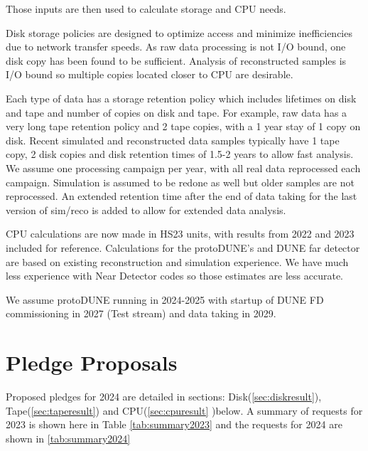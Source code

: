 \documentclass[12pt]{article}
\begin{document}
Those inputs are then used to calculate storage and CPU needs. 

Disk storage policies are designed to optimize access and minimize inefficiencies due to network transfer speeds.  As raw data processing is not I/O bound, one disk copy has been found to be sufficient.  Analysis of reconstructed samples is I/O bound so multiple copies located closer to CPU are desirable. 

Each type of data has a storage retention policy which includes lifetimes on disk and tape and number of copies on disk and tape.  For example, raw data has a very long tape retention policy and 2 tape copies, with a 1 year stay of 1 copy on disk.   Recent simulated and reconstructed data samples typically have 1 tape copy, 2 disk copies and disk retention times of 1.5-2 years to allow fast analysis.   We assume one processing campaign per year, with all real data reprocessed each campaign.   Simulation is assumed to be redone as well but older samples are not reprocessed.  An extended retention time after the end of data taking for the last version of sim/reco is added to allow for extended data analysis. 

CPU calculations are now made in HS23 units, with results from 2022 and 2023 included for reference.  Calculations for the protoDUNE's and DUNE far detector are based on existing reconstruction and simulation experience.  We have much less experience with Near Detector codes so those estimates are less accurate.

We assume protoDUNE running in 2024-2025 with startup of DUNE FD commissioning in 2027 (Test stream) and data taking in 2029. 

\section{Pledge Proposals}

Proposed pledges for 2024 are detailed  in sections: Disk(\ref{sec:diskresult}), Tape(\ref{sec:taperesult}) and CPU(\ref{sec:cpuresult} )below.   A summary of requests for 2023 is shown here in Table \ref{tab:summary2023} and the requests for 2024 are shown in \ref{tab:summary2024} 
\end{document}
